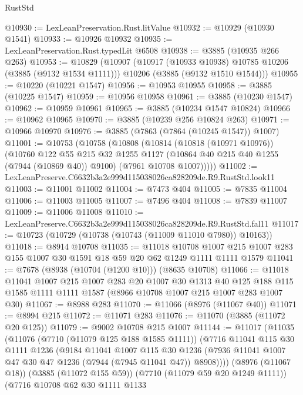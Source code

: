 \begin{lexlean}{RustStd}
\begin{coremodule}
@10930 := LexLeanPreservation.Rust.litValue
@10932 := @10929 (@10930 @1541)
@10933 := @10926 @10932
@10935 := LexLeanPreservation.Rust.typedLit @6508
@10938 := @3885 (@10935 @266 @263)
@10953 := @10829
    (@10907
      (@10917 (@10933 @10938) @10785 @10206 (@3885 (@9132 @1534 @1111)))
      @10206
      (@3885 (@9132 @1510 @1544)))
@10955 := @10220 (@10221 @1547)
@10956 := @10953 @10955
@10958 := @3885 (@10225 @1547)
@10959 := @10956 @10958
@10961 := @3885 (@10230 @1547)
@10962 := @10959 @10961
@10965 := @3885 (@10234 @1547 @10824)
@10966 := @10962 @10965
@10970 := @3885 (@10239 @256 @10824 @263)
@10971 := @10966 @10970
@10976 := @3885 (@7863 (@7864 (@10245 @1547)) @1007)
@11001 := @10753
    (@10758
      (@10808
        (@10814
          (@10818 (@10971 @10976))
          (@10760
            @122
            @55
            @215
            @32
            @1255
            @1127
            (@10864 @40 @215 @40 @1255 (@7944 (@10869 @40)) @9100)
            (@7961 @10708 @1007)))))
@11002 := LexLeanPreserve.C6632b3a2e999d115038026ca828209de.R9.RustStd.look11
@11003 := @11001 @11002
@11004 := @7473 @404
@11005 := @7835 @11004
@11006 := @11003 @11005
@11007 := @7496 @404
@11008 := @7839 @11007
@11009 := @11006 @11008
@11010 := LexLeanPreserve.C6632b3a2e999d115038026ca828209de.R9.RustStd.fal11
@11017 := @10723 (@10729 (@10738 (@10743 (@11009 @11010 @7980)) @10163))
@11018 := @8914 @10708
@11035 := @11018
    @10708
    @1007
    @215
    @1007
    @283
    @155
    @1007
    @30
    @1591
    @18
    @59
    @20
    @62
    @1249
    @1111
    @1111
    @1579
@11041 := @7678 (@8938 (@10704 (@1200 @10))) (@8635 @10708)
@11066 := @11018
    @11041
    @1007
    @215
    @1007
    @283
    @20
    @1007
    @30
    @1313
    @40
    @125
    @188
    @115
    @1585
    @1111
    @1111
    @1587
    (@8966 @10708 @1007 @215 @1007 @283 @1007 @30)
@11067 := @8988 @283
@11070 := @11066 (@8976 (@11067 @40))
@11071 := @8994 @215
@11072 := @11071 @283
@11076 := @11070 (@3885 (@11072 @20 @125))
@11079 := @9002 @10708 @215 @1007
@11144 := @11017
    (@11035
      (@11076
        (@7710 (@11079 @125 @188 @1585 @1111))
        (@7716
          @11041
          @115
          @30
          @1111
          @1236
          (@9184
            @11041
            @1007
            @115
            @30
            @1236
            (@7936 @11041 @1007 @47 @30 @47 @1236 (@7944 (@7945 @11041 @47)) @8908))))
      (@8976 (@11067 @18))
      (@3885 (@11072 @155 @59))
      (@7710 (@11079 @59 @20 @1249 @1111))
      (@7716
        @10708
        @62
        @30
        @1111
        @1133

\end{coremodule}
\end{lexlean}
